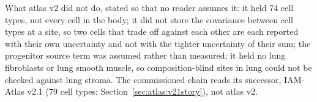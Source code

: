 What atlas v2 did not do, stated so that no reader assumes it: it held 74 cell types, not every cell in the body; it did not store the covariance between cell types at a site, so two cells that trade off against each other are each reported with their own uncertainty and
not with the tighter uncertainty of their sum; the progenitor source term was assumed rather than measured; it held no lung fibroblasts or lung smooth muscle, so composition-blind sites
in lung could not be checked against lung stroma. The commissioned chain reads its successor, IAM-Atlas v2.1 (79 cell types; Section~\ref{sec:atlas:v21story}), not atlas v2. \openprob
